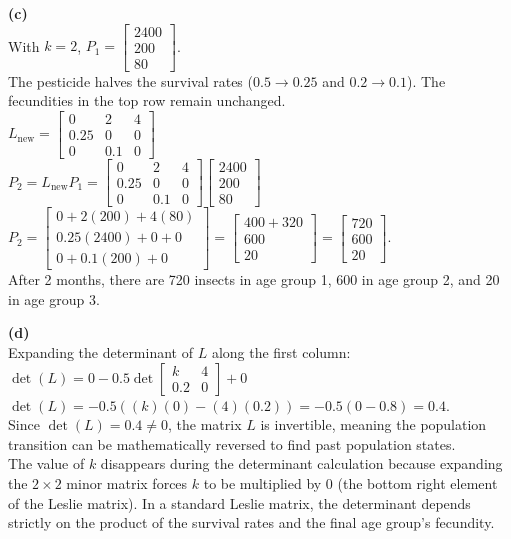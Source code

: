 \begin{solution}
\medskip
\textbf{(c)} \\
With $k = 2$, $P_1 = \begin{bmatrix} 2400 \\ 200 \\ 80 \end{bmatrix}$. \\
The pesticide halves the survival rates ($0.5 \to 0.25$ and $0.2 \to 0.1$). The fecundities in the top row remain unchanged. \\
$L_{\text{new}} = \begin{bmatrix} 0 & 2 & 4 \\ 0.25 & 0 & 0 \\ 0 & 0.1 & 0 \end{bmatrix}$ \\
$P_2 = L_{\text{new}} P_1 = \begin{bmatrix} 0 & 2 & 4 \\ 0.25 & 0 & 0 \\ 0 & 0.1 & 0 \end{bmatrix} \begin{bmatrix} 2400 \\ 200 \\ 80 \end{bmatrix}$ \\
$P_2 = \begin{bmatrix} 0 + 2(200) + 4(80) \\ 0.25(2400) + 0 + 0 \\ 0 + 0.1(200) + 0 \end{bmatrix} = \begin{bmatrix} 400 + 320 \\ 600 \\ 20 \end{bmatrix} = \begin{bmatrix} 720 \\ 600 \\ 20 \end{bmatrix}$. \\
After 2 months, there are 720 insects in age group 1, 600 in age group 2, and 20 in age group 3.

\medskip
\textbf{(d)} \\
Expanding the determinant of $L$ along the first column: \\
$\det(L) = 0 - 0.5 \det\begin{bmatrix} k & 4 \\ 0.2 & 0 \end{bmatrix} + 0$ \\
$\det(L) = -0.5 \left( (k)(0) - (4)(0.2) \right) = -0.5(0 - 0.8) = 0.4$. \\
Since $\det(L) = 0.4 \neq 0$, the matrix $L$ is invertible, meaning the population transition can be mathematically reversed to find past population states. \\
The value of $k$ disappears during the determinant calculation because expanding the $2 \times 2$ minor matrix forces $k$ to be multiplied by $0$ (the bottom right element of the Leslie matrix). In a standard Leslie matrix, the determinant depends strictly on the product of the survival rates and the final age group's fecundity.
\end{solution}

